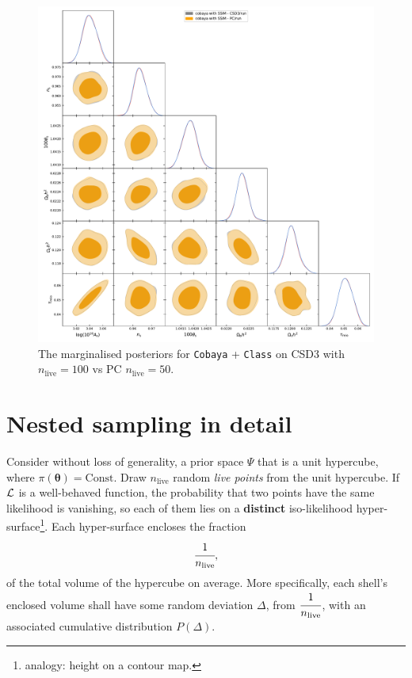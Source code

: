 \documentclass[usenatbib]{mnras}
\begin{document}
\begin{landscape}
\begin{figure}
  \centering %
  \includegraphics[height=\textheight]{./illustrations/cosmo-pc.pdf}
  \caption{The marginalised posteriors for \texttt{Cobaya} +
    \texttt{Class} on CSD3 with \(n_\text{live}=100\) vs PC
    \(n_\text{live}=50\). } \label{fig:cosmology-pc}
\end{figure}
\end{landscape}


\appendix

\section{Nested sampling in detail}\label{sec:ns}
Consider without loss of generality, a prior space \(\Psi\) that is a
unit hypercube, where \(\pi(\bm{\theta}) = \text{Const.}\) Draw
\(n_\text{live}\) random \emph{live points} from the unit
hypercube. If \({\cal L}\) is a well-behaved function, the probability
that two points have the same likelihood is vanishing, so each of them
lies on a \textbf{distinct} iso-likelihood
hyper-surface\footnote{analogy: height on a contour map. }. Each
hyper-surface encloses the fraction
\begin{equation}
\cfrac{1}{n_\text{live}},
\end{equation}
of the total volume of the hypercube on average. More specifically,
each shell's enclosed volume shall have some random deviation \(\Delta\), from
\(\cfrac{1}{n_\text{live}}\), with an associated cumulative
distribution \(P(\Delta)\).
\end{document}
